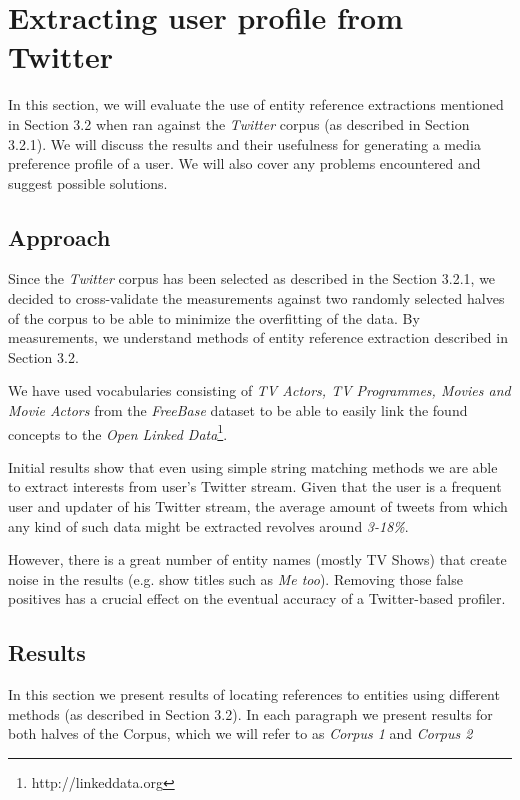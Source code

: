 \section{Extracting user profile from Twitter}

In this section, we will evaluate the use of entity reference extractions
mentioned in Section 3.2 when ran against the \textit{Twitter} corpus (as described in Section 3.2.1).
We will discuss the results and their usefulness for generating a media preference profile of a user.
We will also cover any problems encountered and suggest possible solutions.

\subsection{Approach}
Since the \textit{Twitter} corpus has been selected as described in the Section 3.2.1,
we decided to cross-validate the measurements against two randomly selected halves of the corpus
to be able to minimize the overfitting of the data. By measurements, we understand methods of
entity reference extraction described in Section 3.2.

We have used vocabularies consisting of \textit{TV Actors, TV Programmes, Movies and Movie Actors} from
the \textit{FreeBase} dataset to be able to easily link the found concepts to the \textit{Open Linked Data}\footnote[1]{http://linkeddata.org}.

Initial results show that even using simple string matching methods we are able to extract interests from
user's Twitter stream. Given that the user is a frequent user and updater of his Twitter stream, the average amount of tweets from which any kind of such data might be extracted revolves around \textit{3-18\%}.

However, there is a great number of entity names (mostly TV Shows) that create noise in the results (e.g. show titles such as \textit{Me too}). Removing those false positives has a crucial effect on the eventual accuracy of a Twitter-based profiler.

\subsection{Results}
In this section we present results of locating references to entities using different methods (as described in Section 3.2).
In each paragraph we present results for both halves of the Corpus, which we will refer to as \textit{Corpus 1} and
\textit{Corpus 2}

